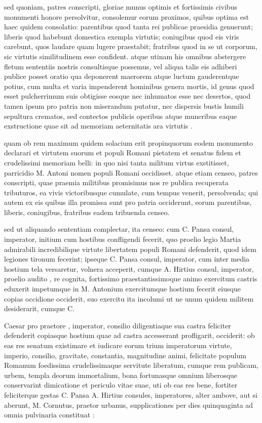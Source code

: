  sed quoniam, patres conscripti, gloriae munus optimis et fortissimis civibus monumenti honore persolvitur, consolemur eorum proximos, quibus optima est haec quidem consolatio: parentibus quod tanta rei publicae praesidia genuerunt; liberis quod habebunt domestica exempla virtutis; coniugibus quod eis viris carebunt, quos laudare quam lugere praestabit; fratribus quod in se ut corporum, sic virtutis similitudinem esse confident. atque utinam his omnibus abstergere fletum sententiis nostris consultisque possemus, vel aliqua talis eis adhiberi publice posset oratio qua deponerent maerorem atque luctum gauderentque potius, cum multa et varia impenderent hominibus genera mortis, id genus quod esset pulcherrimum suis obtigisse eosque nec inhumatos esse nec desertos, quod tamen ipsum pro patria non miserandum putatur, nec dispersis bustis humili sepultura crematos, sed contectos publicis operibus atque muneribus eaque exstructione quae sit ad memoriam aeternitatis ara virtutis .

 quam ob rem maximum quidem solacium erit propinquorum eodem monumento declarari et virtutem suorum et populi Romani pietatem et senatus fidem et crudelissimi memoriam belli: in quo nisi tanta militum virtus exstitisset, parricidio M. Antoni nomen populi Romani occidisset. atque etiam censeo, patres conscripti, quae praemia militibus promisimus nos re publica recuperata tributuros, ea vivis victoribusque cumulate, cum tempus venerit, persolvenda; qui autem ex eis quibus illa promissa sunt pro patria occiderunt, eorum parentibus, liberis, coniugibus, fratribus eadem tribuenda censeo.

 sed ut aliquando sententiam complectar, ita censeo: cum C. Pansa consul, imperator, initium cum hostibus confligendi fecerit, quo proelio legio Martia admirabili incredibilique virtute libertatem populi Romani defenderit, quod idem legiones tironum fecerint; ipseque C. Pansa consul, imperator, cum inter media hostium tela versaretur, volnera acceperit, cumque A. Hirtius consul, imperator, proelio audito , re cognita, fortissimo praestantissimoque animo exercitum castris eduxerit impetumque in M. Antonium exercitumque hostium fecerit eiusque copias occidione occiderit, suo exercitu ita incolumi ut ne unum quidem militem desiderarit, cumque C.

 Caesar pro praetore , imperator, consilio diligentiaque sua castra feliciter defenderit copiasque hostium quae ad castra accesserant profligarit, occiderit: ob eas res senatum existimare et iudicare eorum trium imperatorum virtute, imperio, consilio, gravitate, constantia, magnitudine animi, felicitate populum Romanum foedissima crudelissimaque servitute liberatum, cumque rem publicam, urbem, templa deorum immortalium, bona fortunasque omnium liberosque conservarint dimicatione et periculo vitae suae, uti ob eas res bene, fortiter feliciterque gestas C. Pansa A. Hirtius consules, imperatores, alter ambove, aut si aberunt, M. Cornutus, praetor urbanus, supplicationes per dies quinquaginta ad omnia pulvinaria constituat :

